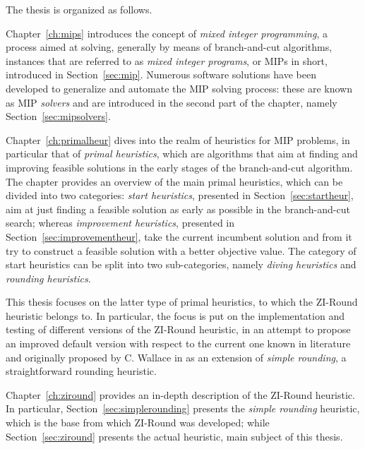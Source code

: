 \documentclass[a4paper,12pt,twoside]{scrbook}
\begin{document}
The thesis is organized as follows. \par
Chapter~\ref{ch:mips} introduces the concept of \textit{mixed integer programming}, a process aimed at solving, generally by means of branch-and-cut algorithms, instances that are referred to as \textit{mixed integer programs}, or MIPs in short, introduced in Section~\ref{sec:mip}. Numerous software solutions have been developed to generalize and automate the MIP solving process: these are known as MIP \textit{solvers} and are introduced in the second part of the chapter, namely Section~\ref{sec:mipsolvers}. \par 
Chapter~\ref{ch:primalheur} dives into the realm of heuristics for MIP problems, in particular that of \textit{primal heuristics}, which are algorithms that aim at finding and improving feasible solutions in the early stages of the branch-and-cut algorithm. The chapter provides an overview of the main primal heuristics, which can be divided into two categories: \textit{start heuristics}, presented in Section~\ref{sec:startheur}, aim at just finding a feasible solution as early as possible in the branch-and-cut search; whereas \textit{improvement heuristics}, presented in Section~\ref{sec:improvementheur}, take the current incumbent solution and from it try to construct a feasible solution with a better objective value. The category of start heuristics can be split into two sub-categories, namely \textit{diving heuristics} and \textit{rounding heuristics}. \par 
This thesis focuses on the latter type of primal heuristics, to which the ZI-Round heuristic belongs to. In particular, the focus is put on the implementation and testing of different versions of the ZI-Round heuristic, in an attempt to propose an improved default version with respect to the current one known in literature and originally proposed by C. Wallace in \cite{wallace2010} as an extension of \textit{simple rounding}, a straightforward rounding heuristic. \par 
Chapter~\ref{ch:ziround} provides an in-depth description of the ZI-Round heuristic. In particular, Section~\ref{sec:simplerounding} presents the \textit{simple rounding} heuristic, which is the base from which ZI-Round was developed; while Section~\ref{sec:ziround} presents the actual heuristic, main subject of this thesis. \par 
\end{document}
